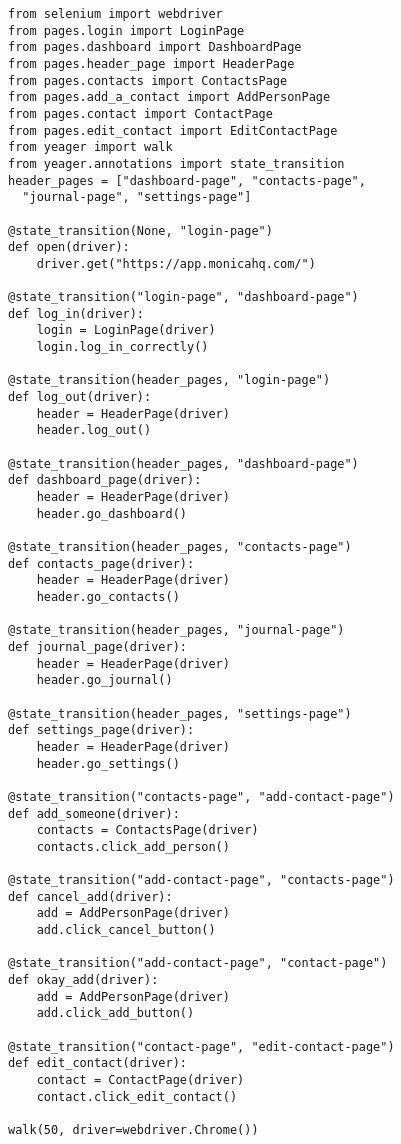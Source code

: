 \begin{Verbatim}[fontsize=\small]
from selenium import webdriver
from pages.login import LoginPage
from pages.dashboard import DashboardPage
from pages.header_page import HeaderPage
from pages.contacts import ContactsPage
from pages.add_a_contact import AddPersonPage
from pages.contact import ContactPage
from pages.edit_contact import EditContactPage
from yeager import walk
from yeager.annotations import state_transition
header_pages = ["dashboard-page", "contacts-page",
  "journal-page", "settings-page"]

@state_transition(None, "login-page")
def open(driver):
    driver.get("https://app.monicahq.com/")

@state_transition("login-page", "dashboard-page")
def log_in(driver):
    login = LoginPage(driver)
    login.log_in_correctly()

@state_transition(header_pages, "login-page")
def log_out(driver):
    header = HeaderPage(driver)
    header.log_out()

@state_transition(header_pages, "dashboard-page")
def dashboard_page(driver):
    header = HeaderPage(driver)
    header.go_dashboard()

@state_transition(header_pages, "contacts-page")
def contacts_page(driver):
    header = HeaderPage(driver)
    header.go_contacts()

@state_transition(header_pages, "journal-page")
def journal_page(driver):
    header = HeaderPage(driver)
    header.go_journal()

@state_transition(header_pages, "settings-page")
def settings_page(driver):
    header = HeaderPage(driver)
    header.go_settings()

@state_transition("contacts-page", "add-contact-page")
def add_someone(driver):
    contacts = ContactsPage(driver)
    contacts.click_add_person()

@state_transition("add-contact-page", "contacts-page")
def cancel_add(driver):
    add = AddPersonPage(driver)
    add.click_cancel_button()

@state_transition("add-contact-page", "contact-page")
def okay_add(driver):
    add = AddPersonPage(driver)
    add.click_add_button()

@state_transition("contact-page", "edit-contact-page")
def edit_contact(driver):
    contact = ContactPage(driver)
    contact.click_edit_contact()

walk(50, driver=webdriver.Chrome())

\end{Verbatim}

